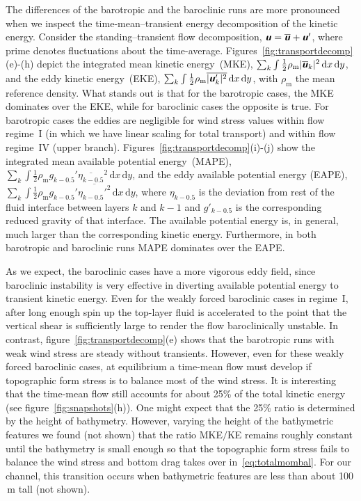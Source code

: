\documentclass{agujournal2019}
\newcommand{\mathbfit}[1]{\textbf{\textit{\textsf{#1}}}}
\newcommand{\bu}		{\mathbfit u}
\newcommand{\half}		{\tfrac{1}{2}}
\newcommand{\rhom} {\rho_{\mathrm{m}}}
\begin{document}
The differences of the barotropic and the baroclinic runs are more pronounced when we inspect the time-mean--transient energy decomposition of the kinetic energy. Consider the standing--transient flow decomposition, $\bu = \overline{\bu}+\bu'$, where prime denotes fluctuations about the time-average. Figures~\ref{fig:transportdecomp}(e)-(h) depict the integrated mean kinetic energy~(MKE), $\sum_k \int\half \rhom |\overline{\bu}_k|^2\,\mathrm{d}x\,\mathrm{d}y$, and the eddy kinetic energy~(EKE),  $\sum_k \int \half\rhom \overline{|\bu'_k|^2}\,\mathrm{d}x\,\mathrm{d}y$, with $\rhom$ the mean reference density. What stands out is that for the barotropic cases, the MKE dominates over the EKE, while for baroclinic cases the opposite is true. For barotropic cases the eddies are negligible for wind stress values within flow regime~I (in which we have linear scaling for total transport) and within flow regime~IV (upper branch). {\color{black}Figures~\ref{fig:transportdecomp}(i)-(j) show the integrated mean available potential energy~(MAPE), $\sum_k \int \half \rhom g_{k-0.5}' \overline{\eta_{k-0.5}}^2\,\mathrm{d}x\,\mathrm{d}y$, and the eddy available potential energy (EAPE), $\sum_k \int \half \rhom g_{k-0.5}' \overline{\eta_{k-0.5}'^2}\,\mathrm{d}x\,\mathrm{d}y$, where $\eta_{k-0.5}$ is the deviation from rest of the fluid interface between layers $k$ and $k-1$ and $g'_{k-0.5}$ is the corresponding reduced gravity of that interface. The available potential energy is, in general, much larger than the corresponding kinetic energy. Furthermore, in both barotropic and baroclinic runs MAPE dominates over the EAPE.}

As we expect, the baroclinic cases have a  more vigorous eddy field, since baroclinic instability is very effective in diverting available potential energy to transient kinetic energy. Even for the weakly forced baroclinic cases in regime~I, after long enough spin up the top-layer fluid is accelerated to the point that the vertical shear is sufficiently large to render the flow baroclinically unstable. In contrast, figure~\ref{fig:transportdecomp}(e) shows that the barotropic runs with weak wind stress are steady without transients.  However, even for these weakly forced baroclinic cases, at equilibrium a time-mean flow must develop if topographic form stress is to balance most of the wind stress. It is interesting that the time-mean flow still accounts for about 25\% of the total kinetic energy (see figure~\ref{fig:snapshots}(h)). One might expect that the 25\% ratio is determined by the height of bathymetry. However, varying the height of the bathymetric features we found (not shown) that the ratio MKE$/$KE remains roughly constant until the bathymetry is small enough so that the topographic form stress fails to balance the wind stress and bottom drag takes over in~\eqref{eq:totalmombal}. For our channel, this transition occurs when bathymetric features are less than about 100$\,\text{m}$ tall (not shown).
\end{document}
